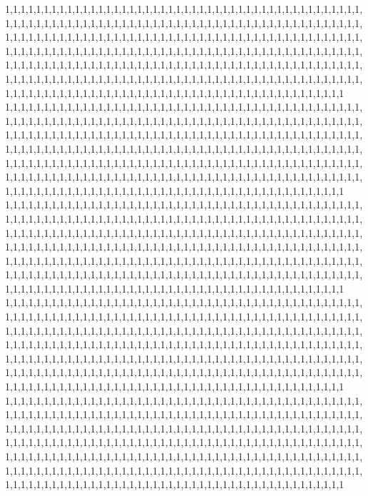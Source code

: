 1,1,1,1,1,1,1,1,1,1,1,1,1,1,1,1,1,1,1,1,1,1,1,1,1,1,1,1,1,1,1,1,1,1,1,1,1,1,1,1,1,1,1,1,1,1,1,1,1,1,1,1,1,1,1,1,1,1,1,1,1,1,1,1,1,1,1,1,1,1,1,1,1,1,1,1,1,1,1,1,1,1,1,1,1,1,1,1,1,1,1,1,1,1,1,1,1,1,1,1,1,1,1,1,1,1,1,1,1,1,1,1,1,1,1,1,1,1,1,1,1,1,1,1,1,1,1,1,1,1,1,1,1,1,1,1,1,1,1,1,1,1,1,1,1,1,1,1,1,1,1,1,1,1,1,1,1,1,1,1,1,1,1,1,1,1,1,1,1,1,1,1,1,1,1,1,1,1,1,1,1,1,1,1,1,1,1,1,1,1,1,1,1,1,1,1,1,1,1,1,1,1,1,1,1,1,1,1,1,1,1,1,1,1,1,1,1,1,1,1,1,1,1,1,1,1,1,1,1,1,1,1,1,1,1,1,1,1,1,1,1,1,1,1,1,1,1,1,1,1,1,1,1,1,1,1,1,1,1,1,1,1,1,1,1,1,1,1,1,1,1,1,1,1,1,1,1,1,1,1,1,1,1,1,1,1,1,1,1,1,1,1,1,1,1,1,1,1,1,1,1,1,1,1,1,1,1,1,1,1,1,1,1,1,1,1,1,1,1,1
1,1,1,1,1,1,1,1,1,1,1,1,1,1,1,1,1,1,1,1,1,1,1,1,1,1,1,1,1,1,1,1,1,1,1,1,1,1,1,1,1,1,1,1,1,1,1,1,1,1,1,1,1,1,1,1,1,1,1,1,1,1,1,1,1,1,1,1,1,1,1,1,1,1,1,1,1,1,1,1,1,1,1,1,1,1,1,1,1,1,1,1,1,1,1,1,1,1,1,1,1,1,1,1,1,1,1,1,1,1,1,1,1,1,1,1,1,1,1,1,1,1,1,1,1,1,1,1,1,1,1,1,1,1,1,1,1,1,1,1,1,1,1,1,1,1,1,1,1,1,1,1,1,1,1,1,1,1,1,1,1,1,1,1,1,1,1,1,1,1,1,1,1,1,1,1,1,1,1,1,1,1,1,1,1,1,1,1,1,1,1,1,1,1,1,1,1,1,1,1,1,1,1,1,1,1,1,1,1,1,1,1,1,1,1,1,1,1,1,1,1,1,1,1,1,1,1,1,1,1,1,1,1,1,1,1,1,1,1,1,1,1,1,1,1,1,1,1,1,1,1,1,1,1,1,1,1,1,1,1,1,1,1,1,1,1,1,1,1,1,1,1,1,1,1,1,1,1,1,1,1,1,1,1,1,1,1,1,1,1,1,1,1,1,1,1,1,1,1,1,1,1,1,1,1,1,1,1,1,1,1,1,1,1,1,1,1,1,1,1
1,1,1,1,1,1,1,1,1,1,1,1,1,1,1,1,1,1,1,1,1,1,1,1,1,1,1,1,1,1,1,1,1,1,1,1,1,1,1,1,1,1,1,1,1,1,1,1,1,1,1,1,1,1,1,1,1,1,1,1,1,1,1,1,1,1,1,1,1,1,1,1,1,1,1,1,1,1,1,1,1,1,1,1,1,1,1,1,1,1,1,1,1,1,1,1,1,1,1,1,1,1,1,1,1,1,1,1,1,1,1,1,1,1,1,1,1,1,1,1,1,1,1,1,1,1,1,1,1,1,1,1,1,1,1,1,1,1,1,1,1,1,1,1,1,1,1,1,1,1,1,1,1,1,1,1,1,1,1,1,1,1,1,1,1,1,1,1,1,1,1,1,1,1,1,1,1,1,1,1,1,1,1,1,1,1,1,1,1,1,1,1,1,1,1,1,1,1,1,1,1,1,1,1,1,1,1,1,1,1,1,1,1,1,1,1,1,1,1,1,1,1,1,1,1,1,1,1,1,1,1,1,1,1,1,1,1,1,1,1,1,1,1,1,1,1,1,1,1,1,1,1,1,1,1,1,1,1,1,1,1,1,1,1,1,1,1,1,1,1,1,1,1,1,1,1,1,1,1,1,1,1,1,1,1,1,1,1,1,1,1,1,1,1,1,1,1,1,1,1,1,1,1,1,1,1,1,1,1,1,1,1,1,1,1,1,1,1,1,1
1,1,1,1,1,1,1,1,1,1,1,1,1,1,1,1,1,1,1,1,1,1,1,1,1,1,1,1,1,1,1,1,1,1,1,1,1,1,1,1,1,1,1,1,1,1,1,1,1,1,1,1,1,1,1,1,1,1,1,1,1,1,1,1,1,1,1,1,1,1,1,1,1,1,1,1,1,1,1,1,1,1,1,1,1,1,1,1,1,1,1,1,1,1,1,1,1,1,1,1,1,1,1,1,1,1,1,1,1,1,1,1,1,1,1,1,1,1,1,1,1,1,1,1,1,1,1,1,1,1,1,1,1,1,1,1,1,1,1,1,1,1,1,1,1,1,1,1,1,1,1,1,1,1,1,1,1,1,1,1,1,1,1,1,1,1,1,1,1,1,1,1,1,1,1,1,1,1,1,1,1,1,1,1,1,1,1,1,1,1,1,1,1,1,1,1,1,1,1,1,1,1,1,1,1,1,1,1,1,1,1,1,1,1,1,1,1,1,1,1,1,1,1,1,1,1,1,1,1,1,1,1,1,1,1,1,1,1,1,1,1,1,1,1,1,1,1,1,1,1,1,1,1,1,1,1,1,1,1,1,1,1,1,1,1,1,1,1,1,1,1,1,1,1,1,1,1,1,1,1,1,1,1,1,1,1,1,1,1,1,1,1,1,1,1,1,1,1,1,1,1,1,1,1,1,1,1,1,1,1,1,1,1,1,1,1,1,1,1,1
1,1,1,1,1,1,1,1,1,1,1,1,1,1,1,1,1,1,1,1,1,1,1,1,1,1,1,1,1,1,1,1,1,1,1,1,1,1,1,1,1,1,1,1,1,1,1,1,1,1,1,1,1,1,1,1,1,1,1,1,1,1,1,1,1,1,1,1,1,1,1,1,1,1,1,1,1,1,1,1,1,1,1,1,1,1,1,1,1,1,1,1,1,1,1,1,1,1,1,1,1,1,1,1,1,1,1,1,1,1,1,1,1,1,1,1,1,1,1,1,1,1,1,1,1,1,1,1,1,1,1,1,1,1,1,1,1,1,1,1,1,1,1,1,1,1,1,1,1,1,1,1,1,1,1,1,1,1,1,1,1,1,1,1,1,1,1,1,1,1,1,1,1,1,1,1,1,1,1,1,1,1,1,1,1,1,1,1,1,1,1,1,1,1,1,1,1,1,1,1,1,1,1,1,1,1,1,1,1,1,1,1,1,1,1,1,1,1,1,1,1,1,1,1,1,1,1,1,1,1,1,1,1,1,1,1,1,1,1,1,1,1,1,1,1,1,1,1,1,1,1,1,1,1,1,1,1,1,1,1,1,1,1,1,1,1,1,1,1,1,1,1,1,1,1,1,1,1,1,1,1,1,1,1,1,1,1,1,1,1,1,1,1,1,1,1,1,1,1,1,1,1,1,1,1,1,1,1,1,1,1,1,1,1,1,1,1,1,1,1
